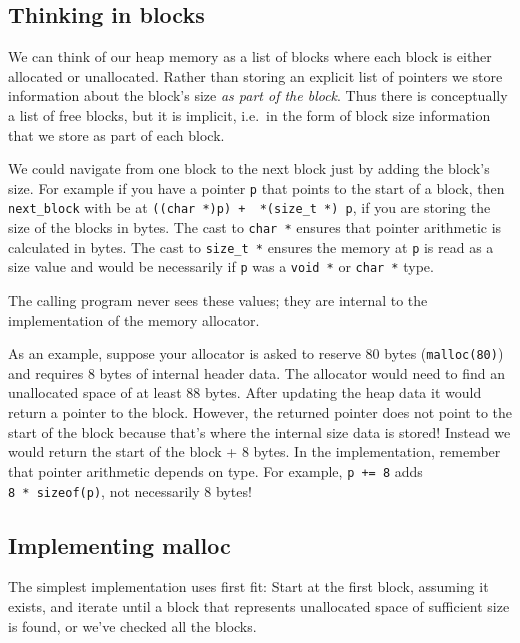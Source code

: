 \subsection{Thinking in blocks}\label{thinking-in-blocks}

We can think of our heap memory as a list of blocks where each block is
either allocated or unallocated. Rather than storing an explicit list of
pointers we store information about the block's size \emph{as part of
the block}. Thus there is conceptually a list of free blocks, but it is
implicit, i.e.~in the form of block size information that we store as
part of each block.

We could navigate from one block to the next block just by adding the
block's size. For example if you have a pointer \texttt{p} that points
to the start of a block, then \texttt{next\_block} with be at
\texttt{((char\ *)p)\ +\ \ *(size\_t\ *)\ p}, if you are storing the
size of the blocks in bytes. The cast to \texttt{char\ *} ensures that
pointer arithmetic is calculated in bytes. The cast to
\texttt{size\_t\ *} ensures the memory at \texttt{p} is read as a size
value and would be necessarily if \texttt{p} was a \texttt{void\ *} or
\texttt{char\ *} type.

The calling program never sees these values; they are internal to the
implementation of the memory allocator.

As an example, suppose your allocator is asked to reserve 80 bytes
(\texttt{malloc(80)}) and requires 8 bytes of internal header data. The
allocator would need to find an unallocated space of at least 88 bytes.
After updating the heap data it would return a pointer to the block.
However, the returned pointer does not point to the start of the block
because that's where the internal size data is stored! Instead we would
return the start of the block + 8 bytes. In the implementation, remember
that pointer arithmetic depends on type. For example, \texttt{p\ +=\ 8}
adds \texttt{8\ *\ sizeof(p)}, not necessarily 8 bytes!

\subsection{Implementing malloc}\label{implementing-malloc}

The simplest implementation uses first fit: Start at the first block,
assuming it exists, and iterate until a block that represents
unallocated space of sufficient size is found, or we've checked all the
blocks.

